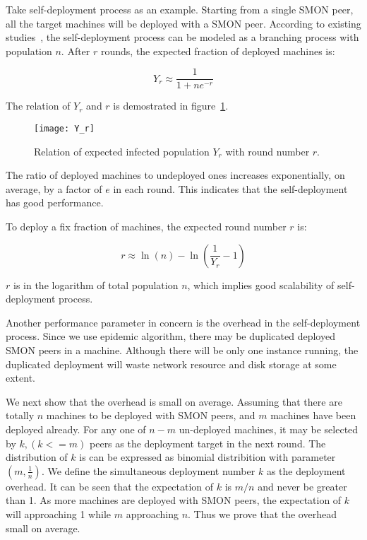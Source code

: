 Take self-deployment process as an example. Starting from a
single SMON peer, all the target machines will be deployed
with a SMON peer.  According to existing
studies~\cite{Eugster2004}, the self-deployment process can
be modeled as a branching process with population $n$. After
$r$ rounds, the expected fraction of deployed machines is:

\begin{equation*}
Y_r \approx \frac{1}{1+ne^{-r}} 
\end{equation*}

The relation of $Y_r$ and $r$ is demostrated in
figure~\ref{fig:yr}.

\begin{figure}
\centering
\texttt{[image: Y\_r]}
\caption{Relation of expected infected population $Y_r$ with
round number $r$.}
\label{fig:yr}
\end{figure}


The ratio of deployed machines to undeployed ones increases
exponentially, on average, by a factor of $e$ in each round.
This indicates that the self-deployment has good
performance.

To deploy a fix fraction of machines, the expected round
number $r$ is:

\begin{equation*}
r \approx \ln(n) - \ln(\frac{1}{Y_r} - 1)
\end{equation*}

$r$ is in the logarithm of total population $n$, which
implies good scalability of self-deployment process.


Another performance parameter in concern is the overhead in
the self-deployment process. Since we use epidemic
algorithm, there may be duplicated deployed SMON peers in a
machine. Although there will be only one instance running,
the duplicated deployment will waste network resource and
disk storage at some extent.

We next show that the overhead is small on average. Assuming
that there are totally $n$ machines to be deployed with SMON
peers, and $m$ machines have been deployed already. For any
one of $n-m$ un-deployed machines, it may be selected by $k,
(k <= m)$ peers as the deployment target in the next round.
The distribution of $k$ is can be expressed as binomial
distribition with parameter $(m, \frac{1}{n})$. We define
the simultaneous deployment number $k$ as the deployment
overhead. It can be seen that the expectation of $k$ is
$m/n$ and never be greater than 1. As more machines are
deployed with SMON peers, the expectation of $k$ will
approaching 1 while $m$ approaching $n$. Thus we prove that
the overhead small on average.





